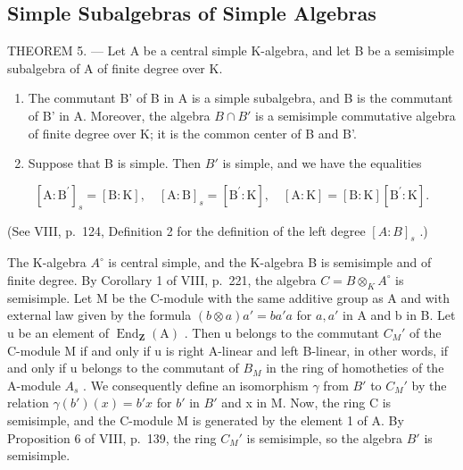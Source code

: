 \subsection{Simple Subalgebras of Simple Algebras}

THEOREM 5. --- Let A be a central simple K-algebra, and let B be a semisimple subalgebra of A of finite degree over K.

\begin{enumerate}
\def\labelenumi{\alph{enumi})}
\item
  The commutant B' of B in A is a simple subalgebra, and B is the commutant of B' in A. Moreover, the algebra \(B \cap B'\) is a semisimple commutative algebra of finite degree over K; it is the common center of B and B'.
\item
  Suppose that B is simple. Then \(B'\) is simple, and we have the equalities
\end{enumerate}

\[
[ \mathrm{A}: \mathrm{B} ^ {\prime} ] _ {s} = [ \mathrm{B}: \mathrm{K} ], \quad [ \mathrm{A}: \mathrm{B} ] _ {s} = [ \mathrm{B} ^ {\prime}: \mathrm{K} ], \quad [ \mathrm{A}: \mathrm{K} ] = [ \mathrm{B}: \mathrm{K} ] [ \mathrm{B} ^ {\prime}: \mathrm{K} ].
\]

(See VIII, p.~124, Definition 2 for the definition of the left degree \([A : B]_s\) .)

The K-algebra \(A^{\circ}\) is central simple, and the K-algebra B is semisimple and of finite degree. By Corollary 1 of VIII, p.~221, the algebra \(C = B \otimes_{K} A^{\circ}\) is semisimple. Let M be the C-module with the same additive group as A and with external law given by the formula \((b \otimes a)a' = ba'a\) for \(a, a'\) in A and b in B. Let u be an element of \(\operatorname{End}_{\mathbf{Z}}(\mathrm{A})\) . Then u belongs to the commutant \(C_{M}'\) of the C-module M if and only if u is right A-linear and left B-linear, in other words, if and only if u belongs to the commutant of \(B_{M}\) in the ring of homotheties of the A-module \(A_{s}\) . We consequently define an isomorphism \(\gamma\) from \(B'\) to \(C_{M}'\) by the relation \(\gamma(b')(x) = b'x\) for \(b'\) in \(B'\) and x in M. Now, the ring C is semisimple, and the C-module M is generated by the element 1 of A. By Proposition 6 of VIII, p.~139, the ring \(C_{M}'\) is semisimple, so the algebra \(B'\) is semisimple.

